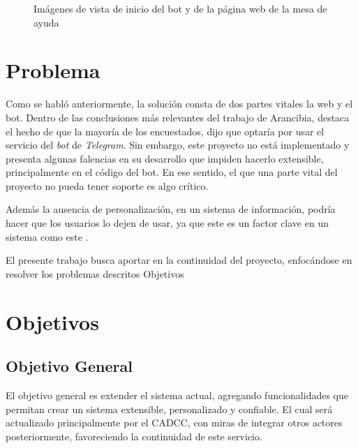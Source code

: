 \begin{figure}[h]
        \caption[Claustro votaciones \acrshort{cadcc}]{Imágenes de vista de inicio del bot y de la página web de la mesa de ayuda}
        \label{fig:home-img-bot}
    \end{figure}

\section{Problema}\label{sec:intro-pro}
    \par Como se habló anteriormente, la solución consta de dos partes vitales la web y el bot. Dentro de las conclusiones más relevantes del trabajo de Arancibia, destaca el hecho de que la mayoría de los encuestados, dijo que optaría por usar el servicio del \textit{bot} de \textit{Telegram}. Sin embargo, este proyecto no está implementado y presenta algunas falencias en su desarrollo que impiden hacerlo extensible, principalmente en el código del bot. En ese sentido, el que una parte vital del proyecto no pueda tener soporte es algo crítico. 
    \par Además la ausencia de personalización, en un sistema de información, podría hacer que los usuarios lo dejen de usar, ya que este es un factor clave en un sistema como este \cite{Paz2021}.
    \par El presente trabajo busca aportar en la continuidad del proyecto, enfocándose en resolver los problemas descritos Objetivos

\section{Objetivos}\label{sec:intro-obj}
  \subsection*{Objetivo General}\label{sec:obj-g}
       El objetivo general es extender el sistema actual, agregando funcionalidades que permitan crear un sistema extensible, personalizado y confiable. El cual será actualizado principalmente por el CADCC, con miras de integrar otros actores posteriormente, favoreciendo la continuidad de este servicio.
        
